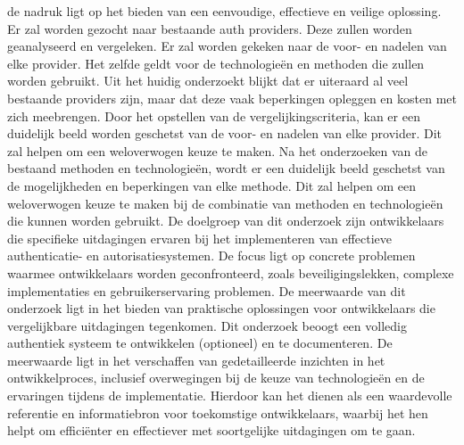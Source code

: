 de nadruk ligt op het bieden van een eenvoudige, effectieve en veilige oplossing.
Er zal worden gezocht naar bestaande auth providers. Deze zullen worden geanalyseerd en vergeleken. Er zal worden gekeken naar de voor- en nadelen van
elke provider. Het zelfde geldt voor de technologieën en methoden die zullen worden gebruikt.
\newline
\newline
Uit het huidig onderzoekt blijkt dat er uiteraard al veel bestaande providers zijn, maar dat deze vaak beperkingen opleggen en kosten met zich meebrengen.
Door het opstellen van de vergelijkingscriteria, kan er een duidelijk beeld worden geschetst van de voor- en nadelen van elke provider. Dit zal helpen
om een weloverwogen keuze te maken. Na het onderzoeken van de bestaand methoden en technologieën, wordt er een duidelijk beeld geschetst van de mogelijkheden
en beperkingen van elke methode. Dit zal helpen om een weloverwogen keuze te maken bij de combinatie van methoden en technologieën die kunnen worden gebruikt.
\newline
\newline
De doelgroep van dit onderzoek zijn ontwikkelaars die specifieke uitdagingen ervaren bij het implementeren van effectieve authenticatie- en 
autorisatiesystemen. De focus ligt op concrete problemen waarmee ontwikkelaars worden geconfronteerd, zoals beveiligingslekken, complexe implementaties 
en gebruikerservaring problemen. 
\newline
\newline
De meerwaarde van dit onderzoek ligt in het bieden van praktische oplossingen voor ontwikkelaars die vergelijkbare uitdagingen tegenkomen. 
Dit onderzoek beoogt een volledig authentiek systeem te ontwikkelen (optioneel) en te documenteren. De meerwaarde ligt in het verschaffen van gedetailleerde 
inzichten in het ontwikkelproces, inclusief overwegingen bij de keuze van technologieën en de ervaringen tijdens de implementatie. Hierdoor kan het 
dienen als een waardevolle referentie en informatiebron voor toekomstige ontwikkelaars, waarbij het hen helpt om efficiënter en effectiever met 
soortgelijke uitdagingen om te gaan.
